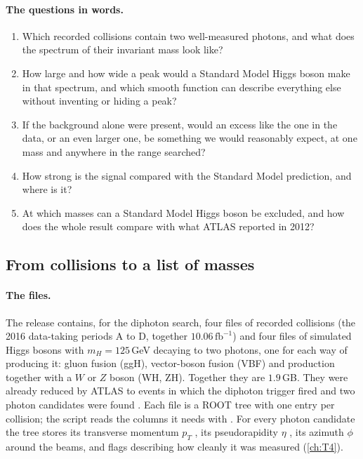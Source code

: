 \paragraph{The questions in words.}
\begin{enumerate}[label=\arabic*.]
  \item Which recorded collisions contain two well-measured photons, and what does the
        spectrum of their invariant mass look like?
  \item How large and how wide a peak would a Standard Model Higgs boson make in that
        spectrum, and which smooth function can describe everything else without inventing
        or hiding a peak?
  \item If the background alone were present, would an excess like the one in the data,
        or an even larger one, be something we would reasonably expect, at one mass and
        anywhere in the range searched?
  \item How strong is the signal compared with the Standard Model prediction, and where is
        it?
  \item At which masses can a Standard Model Higgs boson be excluded, and how does the
        whole result compare with what ATLAS reported in 2012?
\end{enumerate}

\subsection{From collisions to a list of masses}
\label{13d:sec:data}

\paragraph{The files.}
The release contains, for the diphoton search, four files of recorded collisions (the 2016
data-taking periods A to D, together $10.06\,\mathrm{fb}^{-1}$) and four files of simulated
Higgs bosons with $m_H=125\,$GeV decaying to two photons, one for each way of producing it:
gluon fusion (ggH), vector-boson fusion (VBF) and production together with a $W$ or $Z$
boson (WH, ZH). Together they are $1.9\,$GB. They were already reduced by ATLAS to events in
which the diphoton trigger fired and two photon candidates were found
\cite{ATLASOpenData2020}. Each file is a ROOT tree with one entry per collision; the script
 reads the columns it needs with . For
every photon candidate the tree stores its transverse momentum $p_T$ , its pseudorapidity $\eta$ , its azimuth
$\phi$ around the beams, and flags describing how cleanly it was measured (\cref{ch:T4}).

